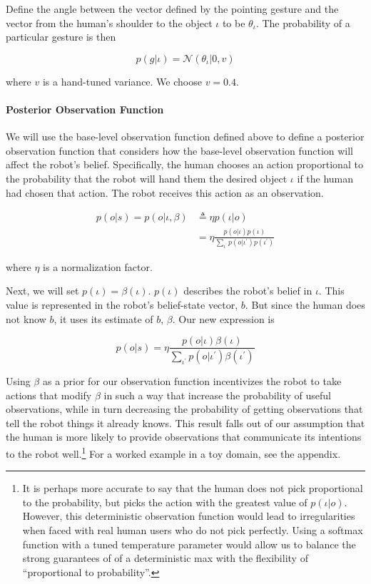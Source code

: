 \documentclass[conference]{IEEEtran}
\begin{document}
Define the angle between the vector defined by the pointing gesture and the vector from the human's shoulder to the object $\iota$ to be $\theta_\iota$. The probability of a particular gesture is then

\begin{equation*}
p(g|\iota) = \mathcal{N}(\theta_\iota | 0, v)
\end{equation*}

where $v$ is a hand-tuned variance. We choose $v = 0.4$. 

\paragraph{Posterior Observation Function}

We will use the base-level observation function defined above to define a posterior observation function that considers how the base-level observation function will affect the robot's belief. Specifically, the human chooses an action proportional to the probability that the robot will hand them the desired object $\iota$ if the human had chosen that action. The robot receives this action as an observation. 

\begin{align*}
p(o|s) = p(o|\iota, \beta) &\triangleq \eta p(\iota|o) \\
&= \eta \frac{p(o|\iota) p(\iota)}{\sum_{\iota^\prime} p(o|\iota^\prime)p(\iota^\prime)} 
\end{align*}

where $\eta$ is a normalization factor. 

Next, we will set $p(\iota) = \beta(\iota)$. $p(\iota)$ describes the robot's belief in $\iota$. This value is represented in the robot's belief-state vector, $b$. But since the human does not know $b$, it uses its estimate of $b$, $\beta$. Our new expression is 


$$p(o|s) = \eta \frac{p(o|\iota) \beta(\iota)}{\sum_{\iota^\prime} p(o|\iota^\prime)\beta(\iota^\prime)} $$

Using $\beta$ as a prior for our observation function incentivizes the robot to take actions that modify $\beta$ in such a way that increase the probability of useful observations, while in turn decreasing the probability of getting observations that tell the robot things it already knows. This result falls out of our assumption that the human is more likely to provide observations that communicate its intentions to the robot well.\footnote{It is perhaps more accurate to say that the human does not pick proportional to the probability, but picks the action with the greatest value  of $p(\iota|o)$. However, this deterministic observation function would lead to irregularities when faced with real human users who do not pick perfectly. Using a softmax function with a tuned temperature parameter would allow us to balance the strong guarantees of of a deterministic max with the flexibility of ``proportional to probability''.}  For a worked example in a toy domain, see the appendix. 
\end{document}
